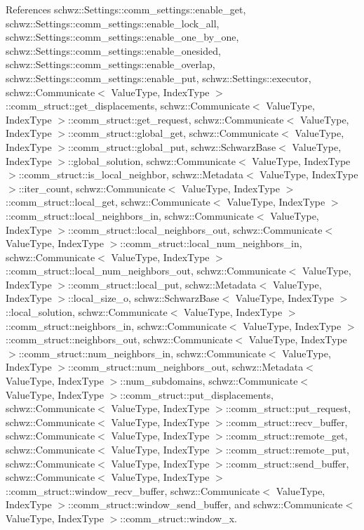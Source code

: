 References schwz\+::\+Settings\+::comm\+\_\+settings\+::enable\+\_\+get, schwz\+::\+Settings\+::comm\+\_\+settings\+::enable\+\_\+lock\+\_\+all, schwz\+::\+Settings\+::comm\+\_\+settings\+::enable\+\_\+one\+\_\+by\+\_\+one, schwz\+::\+Settings\+::comm\+\_\+settings\+::enable\+\_\+onesided, schwz\+::\+Settings\+::comm\+\_\+settings\+::enable\+\_\+overlap, schwz\+::\+Settings\+::comm\+\_\+settings\+::enable\+\_\+put, schwz\+::\+Settings\+::executor, schwz\+::\+Communicate$<$ Value\+Type, Index\+Type $>$\+::comm\+\_\+struct\+::get\+\_\+displacements, schwz\+::\+Communicate$<$ Value\+Type, Index\+Type $>$\+::comm\+\_\+struct\+::get\+\_\+request, schwz\+::\+Communicate$<$ Value\+Type, Index\+Type $>$\+::comm\+\_\+struct\+::global\+\_\+get, schwz\+::\+Communicate$<$ Value\+Type, Index\+Type $>$\+::comm\+\_\+struct\+::global\+\_\+put, schwz\+::\+Schwarz\+Base$<$ Value\+Type, Index\+Type $>$\+::global\+\_\+solution, schwz\+::\+Communicate$<$ Value\+Type, Index\+Type $>$\+::comm\+\_\+struct\+::is\+\_\+local\+\_\+neighbor, schwz\+::\+Metadata$<$ Value\+Type, Index\+Type $>$\+::iter\+\_\+count, schwz\+::\+Communicate$<$ Value\+Type, Index\+Type $>$\+::comm\+\_\+struct\+::local\+\_\+get, schwz\+::\+Communicate$<$ Value\+Type, Index\+Type $>$\+::comm\+\_\+struct\+::local\+\_\+neighbors\+\_\+in, schwz\+::\+Communicate$<$ Value\+Type, Index\+Type $>$\+::comm\+\_\+struct\+::local\+\_\+neighbors\+\_\+out, schwz\+::\+Communicate$<$ Value\+Type, Index\+Type $>$\+::comm\+\_\+struct\+::local\+\_\+num\+\_\+neighbors\+\_\+in, schwz\+::\+Communicate$<$ Value\+Type, Index\+Type $>$\+::comm\+\_\+struct\+::local\+\_\+num\+\_\+neighbors\+\_\+out, schwz\+::\+Communicate$<$ Value\+Type, Index\+Type $>$\+::comm\+\_\+struct\+::local\+\_\+put, schwz\+::\+Metadata$<$ Value\+Type, Index\+Type $>$\+::local\+\_\+size\+\_\+o, schwz\+::\+Schwarz\+Base$<$ Value\+Type, Index\+Type $>$\+::local\+\_\+solution, schwz\+::\+Communicate$<$ Value\+Type, Index\+Type $>$\+::comm\+\_\+struct\+::neighbors\+\_\+in, schwz\+::\+Communicate$<$ Value\+Type, Index\+Type $>$\+::comm\+\_\+struct\+::neighbors\+\_\+out, schwz\+::\+Communicate$<$ Value\+Type, Index\+Type $>$\+::comm\+\_\+struct\+::num\+\_\+neighbors\+\_\+in, schwz\+::\+Communicate$<$ Value\+Type, Index\+Type $>$\+::comm\+\_\+struct\+::num\+\_\+neighbors\+\_\+out, schwz\+::\+Metadata$<$ Value\+Type, Index\+Type $>$\+::num\+\_\+subdomains, schwz\+::\+Communicate$<$ Value\+Type, Index\+Type $>$\+::comm\+\_\+struct\+::put\+\_\+displacements, schwz\+::\+Communicate$<$ Value\+Type, Index\+Type $>$\+::comm\+\_\+struct\+::put\+\_\+request, schwz\+::\+Communicate$<$ Value\+Type, Index\+Type $>$\+::comm\+\_\+struct\+::recv\+\_\+buffer, schwz\+::\+Communicate$<$ Value\+Type, Index\+Type $>$\+::comm\+\_\+struct\+::remote\+\_\+get, schwz\+::\+Communicate$<$ Value\+Type, Index\+Type $>$\+::comm\+\_\+struct\+::remote\+\_\+put, schwz\+::\+Communicate$<$ Value\+Type, Index\+Type $>$\+::comm\+\_\+struct\+::send\+\_\+buffer, schwz\+::\+Communicate$<$ Value\+Type, Index\+Type $>$\+::comm\+\_\+struct\+::window\+\_\+recv\+\_\+buffer, schwz\+::\+Communicate$<$ Value\+Type, Index\+Type $>$\+::comm\+\_\+struct\+::window\+\_\+send\+\_\+buffer, and schwz\+::\+Communicate$<$ Value\+Type, Index\+Type $>$\+::comm\+\_\+struct\+::window\+\_\+x.

